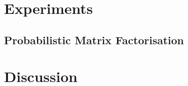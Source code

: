 \section{Experiments}


\subsection{Probabilistic Matrix Factorisation}

\section{Discussion}










